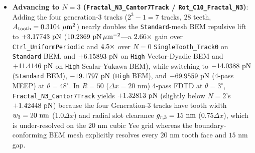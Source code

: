 \documentclass[11pt,letterpaper]{article}
\begin{document}
\begin{itemize}
    \item \textbf{Advancing to $N=3$ (\texttt{Fractal\_N3\_Cantor7Track} / \texttt{Rot\_C10\_Fractal\_N3})}: Adding the four generation-3 tracks ($2^3 - 1 = 7$ tracks, $28$ teeth, $A_{\rm tooth} = 0.3104\ \mu\text{m}^2$) nearly doubles the \texttt{Standard}-mesh BEM repulsive lift to $+3.17743{}\text{ pN}$ ($10.2369{}\text{ pN}\,\mu\text{m}^{-2}$---a $2.66{}\times$ gain over \texttt{Ctrl\_UniformPeriodic} and $4.5{}\times$ over $N=0$ \texttt{SingleTooth\_Track0} on \texttt{Standard} BEM, and $+6.15893{}\text{ pN}$ on \texttt{High} Vector-Dyadic BEM and $+11.4146{}\text{ pN}$ on \texttt{High} Scalar-Yukawa BEM), while switching to $-14.0388{}\text{ pN}$ (\texttt{Standard} BEM), $-19.1797{}\text{ pN}$ (\texttt{High} BEM), and $-69.9559{}\text{ pN}$ (4-pass MEEP) at $\theta=48^\circ$. In $R=50$ ($\Delta x = 20\text{ nm}$) 4-pass FDTD at $\theta=3^\circ$, \texttt{Fractal\_N3\_Cantor7Track} yields $+1.32813{}\text{ pN}$ (slightly below $N=2$'s $+1.42448{}\text{ pN}$) because the four Generation-3 tracks have tooth width $w_3 = 20{}\text{ nm}$ ($1.0\Delta x$) and radial slot clearance $g_{r,3} = 15{}\text{ nm}$ ($0.75\Delta x$), which is under-resolved on the $20\text{ nm}$ cubic Yee grid whereas the boundary-conforming BEM mesh explicitly resolves every $20\text{ nm}$ tooth face and $15\text{ nm}$ gap.
\end{itemize}
\end{document}
